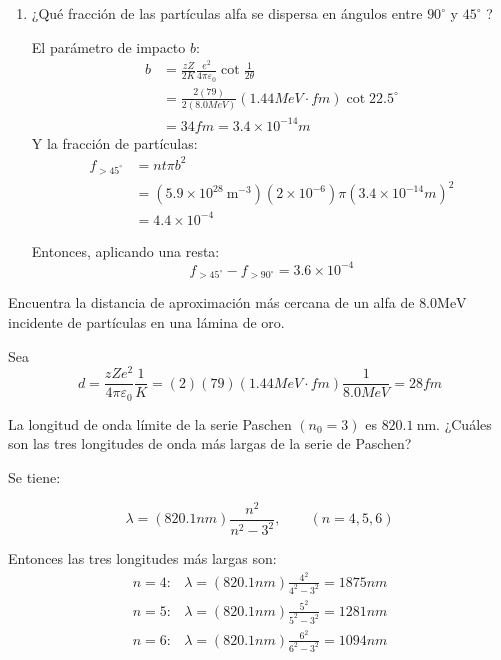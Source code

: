 \begin{problema}
\begin{enumerate}
        \item  ¿Qué fracción de las partículas alfa se dispersa en ángulos entre $90^{\circ}$ y $45^{\circ}$ ?
        \begin{sol}
            El parámetro de impacto $b$: 
            \begin{align*}
                b &= \frac{zZ}{2K}\frac{e^2}{4\pi \varepsilon_0}\cot \frac{1}{2\theta}\\
                &= \frac{2(79)}{2(8.0 MeV)}(1.44 Me V\cdot fm)\cot 22.5^{\circ}\\
                &= 34 fm = 3.4\times 10^{-14}m
            \end{align*}
            Y la fracción de partículas: 
            \begin{align*}
                f_{>45^{\circ}} &= nt\pi b^2\\
                                &= (5.9 \times 10^{28} \mathrm{~m}^{-3})(2\times 10^{-6})\pi (3.4\times 10^{-14}m)^2\\
                                &= 4.4 \times 10^{-4}
            \end{align*}

            Entonces, aplicando una resta: 
            $$f_{>45^{\circ}}-f_{>90^{\circ}}= 3.6\times 10^{-4}$$
            
        \end{sol}
    \end{enumerate}
    

\end{problema}
\begin{problema}
    [Problema 5]  Encuentra la distancia de aproximación más cercana de un alfa de $8.0 \mathrm{MeV}$ incidente de partículas en una lámina de oro.
    \begin{sol}
            Sea 
            $$d=\frac{zZe^2}{4\pi \varepsilon_0}\frac{1}{K}=(2)(79)(1.44 MeV\cdot fm)\frac{1}{8.0 MeV}=28 fm$$
    \end{sol}
\end{problema}
\begin{problema}
    [Problema 6]  La longitud de onda límite de la serie Paschen $\left(n_{0}=3\right)$ es $820.1 \mathrm{~nm}$. ¿Cuáles son las tres longitudes de onda más largas de la serie de Paschen?
    \begin{sol}
            Se tiene: 
            \begin{cajita}
                $$\lambda = (820.1 nm)\frac{n^2}{n^2-3^2},\qquad (n=4,5,6)$$
            \end{cajita}
            Entonces las tres longitudes más largas son: 
            \begin{align*}
                n=4: & \lambda = (820.1 nm)\frac{4^2}{4^2-3^2}=1875 nm\\
                n=5: & \lambda = (820.1 nm)\frac{5^2}{5^2-3^2} = 1281 nm\\
                n=6: & \lambda = (820.1 nm)\frac{6^2}{6^2-3^2} = 1094 nm\\
            \end{align*}
    \end{sol}
\end{problema}

